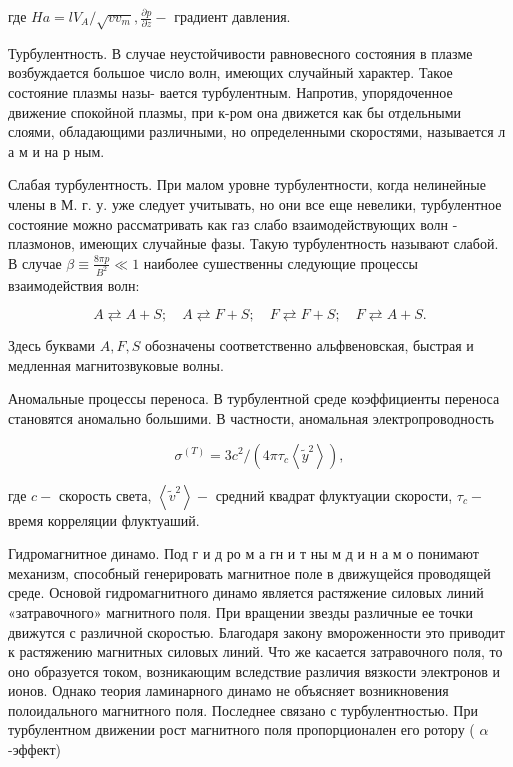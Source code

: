 \documentclass[10pt]{article}
\begin{document}
где $H a=l V_{A} / \sqrt{v v_{m}}, \frac{\partial p}{\partial z}-$ градиент давления.



Турбулентность. В случае неустойчивости равновесного состояния в плазме возбуждается большое число волн, имеющих случайный характер. Такое состояние плазмы назы- вается турбулентным. Напротив, упорядоченное движение спокойной плазмы, при к-ром она движется как бы отдельными слоями, обладающими различными, но определенными скоростями, называется л а м и на р ным.



Слабая турбулентность. При малом уровне турбулентности, когда нелинейные члены в М. г. у. уже следует учитывать, но они все еще невелики, турбулентное состояние можно рассматривать как газ слабо взаимодействующих волн - плазмонов, имеющих случайные фазы. Такую турбулентность называют слабой. В случае $\beta \equiv \frac{8 \pi p}{B^{2}} \ll 1$ наиболее сушественны следующие процессы взаимодействия волн:



\[

A \rightleftarrows A+S ; \quad A \rightleftarrows F+S ; \quad F \rightleftarrows F+S ; \quad F \rightleftarrows A+S .

\]



Здесь буквами $A, F, S$ обозначены соответственно альфвеновская, быстрая и медленная магнитозвуковые волны.



Аномальные процессы переноса. В турбулентной среде коэффициенты переноса становятся аномально большими. В частности, аномальная электропроводность



\[

\sigma^{(T)}=3 c^{2} /\left(4 \pi \tau_{c}\left\langle\tilde{y}^{2}\right\rangle\right),

\]



где $c-$ скорость света, $\left\langle\widetilde{v}^{2}\right\rangle-$ средний квадрат флуктуации скорости, $\tau_{c}-$ время корреляции флуктуаший.



Гидромагнитное динамо. Под г и д ро м а гн и т ны м д и н а м о понимают механизм, способный генерировать магнитное поле в движущейся проводящей среде. Основой гидромагнитного динамо является растяжение силовых линий «затравочного» магнитного поля. При вращении звезды различные ее точки движутся с различной скоростью. Благодаря закону вмороженности это приводит к растяжению магнитных силовых линий. Что же касается затравочного поля, то оно образуется током, возникающим вследствие различия вязкости электронов и ионов. Однако теория ламинарного динамо не объясняет возникновения полоидального магнитного поля. Последнее связано с турбулентностью. При турбулентном движении рост магнитного поля пропорционален его ротору ( $\alpha$-эффект)
\end{document}

